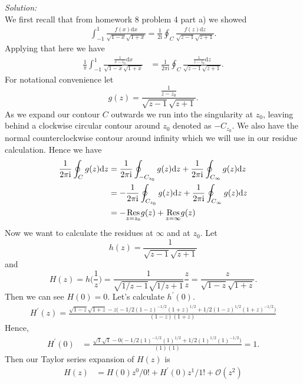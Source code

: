 \documentclass[10pt]{amsart}
\newcommand{\D}{\mathrm{d}}
\newcommand{\I}{\mathrm{i}}
\theoremstyle{nonumberplain}
\begin{document}
\begin{enumerate}[label={\bf {\arabic*}:}]
\begin{enumerate}
\textit{Solution:} \\
We first recall that from homework 8 problem 4 part a) we showed
\begin{align}
\int_{-1}^1 \frac {f(x)\D x} {\sqrt {1 - x} \sqrt {1 + x}} = \frac 1 {2 \I} \oint_C \frac {f(z)\D z} {\sqrt {z - 1} \sqrt {z + 1}}.
\label{eq:eq3}
\end{align}
Applying that here we have
\begin{align*}
\frac 1 \pi \int_{-1}^1 \frac {\frac 1 {x - z_0}\D x} {\sqrt {1 - x} \sqrt {1 + x}}
	&= \frac 1 {2 \pi \I} \oint_C \frac {\frac 1 {z - z_0}\D z} {\sqrt {z - 1} \sqrt {z + 1}}.
\end{align*}
For notational convenience let
$$g(z) = \frac {\frac 1 {z - z_0}} {\sqrt {z - 1} \sqrt {z + 1}}.$$
As we expand our contour $C$ outwards we run into the singularity at $z_0$, leaving behind a clockwise circular contour around $z_0$ denoted as $-C_{z_0}$.
We also have the normal counterclockwise contour around infinity which we will use in our residue calculation.
Hence we have
\begin{align}
\frac 1 {2 \pi \I} \oint_C g(z) \D z
	&= \frac 1 {2 \pi \I} \oint_{-C_{z_0}} g(z) \D z + \frac 1 {2 \pi \I} \oint_{C_\infty} g(z) \D z \nonumber \\
	&= - \frac 1 {2 \pi \I} \oint_{C_{z_0}} g(z) \D z + \frac 1 {2 \pi \I} \oint_{C_\infty} g(z) \D z \nonumber \\
	&= - \underset{z=z_0}{{\rm Res}} g(z)  + \underset{z=\infty}{{\rm Res}} g(z) \label{eq:eq4}
\end{align}
Now we want to calculate the residues at $\infty$ and at $z_0$.
Let
$$ h(z) = \frac 1 {\sqrt {z - 1} \sqrt {z + 1}} $$
and
$$H(z) = h\bigg( \frac 1 z \bigg) = \frac 1 {\sqrt {1/z - 1} \sqrt {1/z + 1}} \frac z z = \frac z {\sqrt {1 - z} \sqrt {1 + z}}. $$
Then we can see $H(0) = 0$.
Let's calculate $h^\prime(0)$.
\begin{align*}
H^\prime(z) = \frac {\sqrt {1 - z} \sqrt {1 + z} - z\big(-1/2(1 - z)^{-1/2}(1 + z)^{1/2} +1/2(1 - z)^{1/2}(1 + z)^{-1/2} \big)}{ (1 - z)(1 + z)}
\end{align*}
Hence,
\begin{align*}
H^\prime(0) &= \frac {\sqrt {1} \sqrt {1} - 0\big(-1/2(1)^{-1/2}(1)^{1/2} +1/2(1)^{1/2}(1)^{-1/2} \big)}{ (1)(1)} = 1.
\end{align*}
Then our Taylor series expansion of $H(z)$ is
\begin{align*}
H(z) &= H(0) z^0 /0! + H^\prime(0) z^1 /1! + \mathcal O (z^2) \\

\end{align*}
\end{enumerate}
\end{enumerate}
\end{document}
